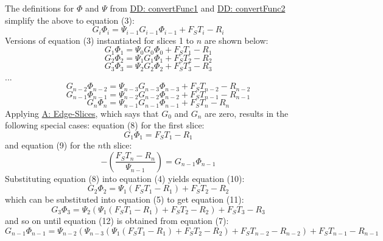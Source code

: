 \documentclass[12pt]{article}
\begin{document}
The definitions for $Φ$ and $Ψ$ from \hyperref[DD:convertFunc1]{DD: convertFunc1} and \hyperref[DD:convertFunc2]{DD: convertFunc2} simplify the above to equation (3):
\begin{dmath}
G_{i} Φ_{i}=Ψ_{i-1} G_{i-1} Φ_{i-1}+{F_{S}} T_{i}-R_{i}
\end{dmath}
Versions of equation (3) instantiated for slices 1 to $n$ are shown below:
\begin{dmath}
G_{1} Φ_{1}=Ψ_{0} G_{0} Φ_{0}+{F_{S}} T_{1}-R_{1}
\end{dmath}
\begin{dmath}
G_{2} Φ_{2}=Ψ_{1} G_{1} Φ_{1}+{F_{S}} T_{2}-R_{2}
\end{dmath}
\begin{dmath}
G_{3} Φ_{3}=Ψ_{2} G_{2} Φ_{2}+{F_{S}} T_{3}-R_{3}
\end{dmath}
...
\begin{dmath}
G_{n-2} Φ_{n-2}=Ψ_{n-3} G_{n-3} Φ_{n-3}+{F_{S}} T_{n-2}-R_{n-2}
\end{dmath}
\begin{dmath}
G_{n-1} Φ_{n-1}=Ψ_{n-2} G_{n-2} Φ_{n-2}+{F_{S}} T_{n-1}-R_{n-1}
\end{dmath}
\begin{dmath}
G_{n} Φ_{n}=Ψ_{n-1} G_{n-1} Φ_{n-1}+{F_{S}} T_{n}-R_{n}
\end{dmath}
Applying \hyperref[A:Edge-Slices]{A: Edge-Slices}, which says that $G_{0}$ and $G_{n}$ are zero, results in the following special cases: equation (8) for the first slice:
\begin{dmath}
G_{1} Φ_{1}={F_{S}} T_{1}-R_{1}
\end{dmath}
and equation (9) for the $n$th slice:
\begin{dmath}
-\left(\frac{{F_{S}} T_{n}-R_{n}}{Ψ_{n-1}}\right)=G_{n-1} Φ_{n-1}
\end{dmath}
Substituting equation (8) into equation (4) yields equation (10):
\begin{dmath}
G_{2} Φ_{2}=Ψ_{1} \left({F_{S}} T_{1}-R_{1}\right)+{F_{S}} T_{2}-R_{2}
\end{dmath}
which can be substituted into equation (5) to get equation (11):
\begin{dmath}
G_{3} Φ_{3}=Ψ_{2} \left(Ψ_{1} \left({F_{S}} T_{1}-R_{1}\right)+{F_{S}} T_{2}-R_{2}\right)+{F_{S}} T_{3}-R_{3}
\end{dmath}
and so on until equation (12) is obtained from equation (7):
\begin{dmath}
G_{n-1} Φ_{n-1}=Ψ_{n-2} \left(Ψ_{n-3} \left(Ψ_{1} \left({F_{S}} T_{1}-R_{1}\right)+{F_{S}} T_{2}-R_{2}\right)+{F_{S}} T_{n-2}-R_{n-2}\right)+{F_{S}} T_{n-1}-R_{n-1}
\end{dmath}
\end{document}
